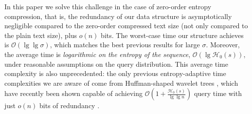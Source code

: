\documentclass[11pt]{article}
\newcommand{\Oh}[1]
    {\ensuremath{\mathcal{O}\left( {#1} \right)}}
\newcommand{\HH}{\mathcal{H}}
\newcommand{\Ho}{\HH_0}
\begin{document}
In this paper we solve this challenge in the case of zero-order
entropy compression, that is, the redundancy of our data structure is
asymptotically negligible compared to the zero-order compressed text
size (not only compared to the plain text size), plus $o(n)$ bits. The
worst-case time our structure achieves is $\Oh{\lg\lg\sigma}$, which
matches the best previous results for large $\sigma$. Moreover, the
average time is {\em logarithmic on the entropy of the sequence},
$\Oh{\lg \Ho(s)}$, under reasonable assumptions on the query
distribution. This average time complexity is also unprecedented: the
only previous entropy-adaptive time complexities we are aware of come
from Huffman-shaped wavelet trees \cite{GGV03}, which have 
recently been shown capable of achieving $\Oh{1+\frac{\Ho(s)}{\lg\lg n}}$
query time with just $o(n)$ bits of redundancy \cite[Thm.~5]{BN11}.
\end{document}
